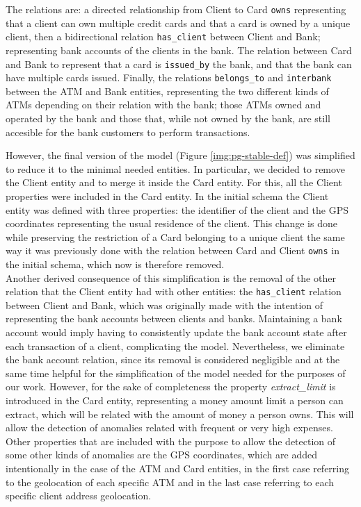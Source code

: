 \documentclass{article}
\begin{document}
The relations are: a directed relationship from Client to Card \texttt{owns} representing that a client can own multiple credit cards and that a card is owned by a unique client, then a bidirectional relation \texttt{has\_client} between Client and Bank; representing bank accounts of the clients in the bank. The relation between Card and Bank to represent that a card is \texttt{issued\_by} the bank, and that the bank can have multiple cards issued. Finally, the relations \texttt{belongs\_to} and \texttt{interbank} between the ATM and Bank entities, representing the two different kinds of ATMs depending on their relation with the bank; those ATMs owned and operated by the bank and those that, while not owned by the bank, are still accesible for the bank customers to perform transactions.

However, the final version of the model (Figure \ref{img:pg-stable-def}) was simplified to reduce it to the minimal needed entities. In particular, we decided to remove the Client entity and to merge it inside the Card entity. For this, all the Client properties were included in the Card entity. In the initial schema the Client entity was defined with three properties: the identifier of the client and the GPS coordinates representing the usual residence of the client. This change is done while preserving the restriction of a Card belonging to a unique client the same way it was previously done with the relation between Card and Client \texttt{owns} in the initial schema, which now is therefore removed. \\
Another derived consequence of this simplification is the removal of the other relation that the Client entity had with other entities: the \texttt{has\_client} relation between Client and Bank, which was originally made with the intention of representing the bank accounts between clients and banks. Maintaining a bank account would imply having to consistently update the bank account state after each transaction of a client, complicating the model. Nevertheless, we eliminate the bank account relation, since its removal is considered negligible and at the same time helpful for the simplification of the model needed for the purposes of our work. %
However, for the sake of completeness the property \textit{extract\_limit} is introduced in the Card entity, representing a money amount limit a person can extract, which will be related with the amount of money a person owns. This will allow the detection of anomalies related with frequent or very high expenses. Other properties that are included with the purpose to allow the detection of some other kinds of anomalies are the GPS coordinates, which are added intentionally in the case of the ATM and Card entities, in the first case referring to the geolocation of each specific ATM and in the last case referring to each specific client address geolocation. 
\end{document}
